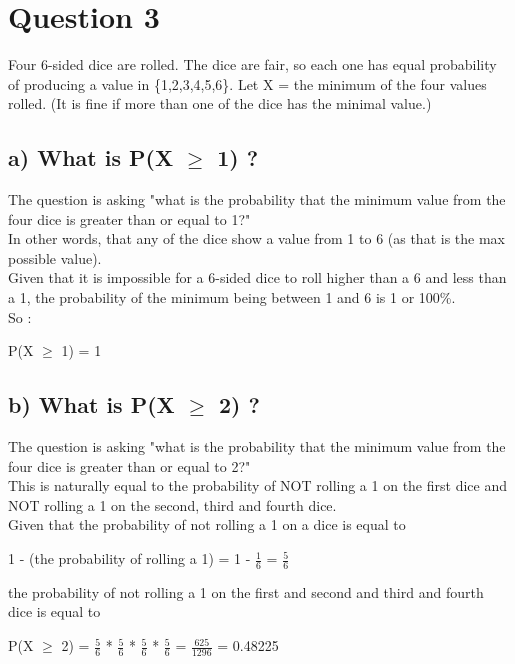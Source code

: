 \documentclass{report}
\begin{document}
	\section*{\hfil Question 3 \hfil}
    Four 6-sided dice are rolled. The dice are fair, so each one has equal probability of producing a value in \{1,2,3,4,5,6\}. Let X = the minimum of the four values rolled. 
    (It is fine if more than one of the dice has the minimal value.)

        \subsection*{a) What is P(X $\geq$ 1) ?}
        The question is asking "what is the probability that the minimum value from the four dice is greater than or equal to 1?"\\
        In other words, that any of the dice show a value from 1 to 6 (as that is the max possible value).\\
        Given that it is impossible for a 6-sided dice to roll higher than a 6 and less than a 1, the probability of the minimum being between 1 and 6 is 1 or 100\%.\\
        So :
        \begin{center}
            P(X $\geq$ 1) = 1
        \end{center}


        \subsection*{b) What is P(X $\geq$ 2) ?}
        The question is asking "what is the probability that the minimum value from the four dice is greater than or equal to 2?"\\
        This is naturally equal to the probability of NOT rolling a 1 on the first dice and NOT rolling a 1 on the second, third and fourth dice.\\
        Given that the probability of not rolling a 1 on a dice is equal to 
        \begin{center}
            1 - (the probability of rolling a 1) = 1 - $\frac{1}{6}$ = $\frac{5}{6}$
        \end{center}
        the probability of not rolling a 1 on the first and second and third and fourth dice is equal to 
        \begin{center}
            P(X $\geq$ 2) = $\frac{5}{6}$ * $\frac{5}{6}$ * $\frac{5}{6}$ * $\frac{5}{6}$ = $\frac{625}{1296}$ = 0.48225
        \end{center}
\end{document}
